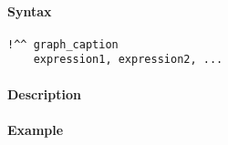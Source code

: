 


	\paragraph{Syntax}\label{syntax}

\begin{verbatim}
!^^ graph_caption
    expression1, expression2, ...
\end{verbatim}

\paragraph{Description}\label{description}

\paragraph{Example}\label{example}


